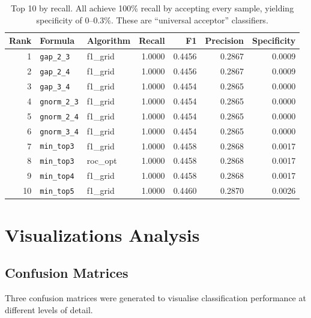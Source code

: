 \documentclass[11pt,a4paper]{article}
\newcommand{\formula}[1]{\texttt{#1}}
\begin{document}
\begin{table}[htbp]
\centering
\caption{Top 10 by recall. All achieve 100\% recall by accepting every sample, yielding specificity of 0--0.3\%. These are ``universal acceptor'' classifiers.}
\label{tab:top_recall}
\begin{tabular}{@{}rllrrrr@{}}
\toprule
\textbf{Rank} & \textbf{Formula} & \textbf{Algorithm} & \textbf{Recall} & \textbf{F1} & \textbf{Precision} & \textbf{Specificity} \\
\midrule
 1 & \formula{gap\_2\_3} & f1\_grid & 1.0000 & 0.4456 & 0.2867 & 0.0009 \\
 2 & \formula{gap\_2\_4} & f1\_grid & 1.0000 & 0.4456 & 0.2867 & 0.0009 \\
 3 & \formula{gap\_3\_4} & f1\_grid & 1.0000 & 0.4454 & 0.2865 & 0.0000 \\
 4 & \formula{gnorm\_2\_3} & f1\_grid & 1.0000 & 0.4454 & 0.2865 & 0.0000 \\
 5 & \formula{gnorm\_2\_4} & f1\_grid & 1.0000 & 0.4454 & 0.2865 & 0.0000 \\
 6 & \formula{gnorm\_3\_4} & f1\_grid & 1.0000 & 0.4454 & 0.2865 & 0.0000 \\
 7 & \formula{min\_top3} & f1\_grid & 1.0000 & 0.4458 & 0.2868 & 0.0017 \\
 8 & \formula{min\_top3} & roc\_opt & 1.0000 & 0.4458 & 0.2868 & 0.0017 \\
 9 & \formula{min\_top4} & f1\_grid & 1.0000 & 0.4458 & 0.2868 & 0.0017 \\
10 & \formula{min\_top5} & f1\_grid & 1.0000 & 0.4460 & 0.2870 & 0.0026 \\
\bottomrule
\end{tabular}
\end{table}


\section{Visualizations Analysis}

\subsection{Confusion Matrices}

Three confusion matrices were generated to visualise classification performance at different levels of detail.
\end{document}
